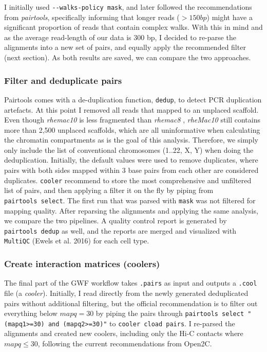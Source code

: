 \documentclass[
  11pt,
  a4paper,
]{scrbook}
\begin{document}
I initially used \texttt{-\/-walks-policy\ mask}, and later followed the
recommendations from \emph{pairtools}, specifically informing that
longer reads (\(>150bp\)) might have a significant proportion of reads
that contain complex walks. With this in mind and as the average
read-length of our data is 300 bp, I decided to re-parse the alignments
into a new set of pairs, and equally apply the recommended filter (next
section). As both results are saved, we can compare the two approaches.

\subsubsection{Filter and deduplicate
pairs}\label{filter-and-deduplicate-pairs}

Pairtools comes with a de-duplication function, \texttt{dedup}, to
detect PCR duplication artefacts. At this point I removed all reads that
mapped to an unplaced scaffold. Even though \emph{rhemac10} is less
fragmented than \emph{rhemac8} , \emph{rheMac10} still contains more
than 2,500 unplaced scaffolds, which are all uninformative when
calculating the chromatin compartments as is the goal of this analysis.
Therefore, we simply only include the list of conventional chromosomes
(1..22, X, Y) when doing the deduplication. Initially, the default
values were used to remove duplicates, where pairs with both sides
mapped within 3 base pairs from each other are considered duplicates.
\texttt{cooler} recommend to store the most comprehensive and unfiltered
list of pairs, and then applying a filter it on the fly by piping from
\texttt{pairtools\ select}. The first run that was parsed with
\texttt{mask} was not filtered for mapping quality. After reparsing the
alignments and applying the same analysis, we compare the two pipelines.
A quality control report is generated by \texttt{pairtools\ dedup} as
well, and the reports are merged and visualized with \texttt{MultiQC}
(Ewels et al. 2016) for each cell type.

\subsubsection{Create interaction matrices
(coolers)}\label{create-interaction-matrices-coolers}

The final part of the GWF workflow takes \texttt{.pairs} as input and
outputs a \texttt{.cool} file (a \emph{cooler}). Initially, I read
directly from the newly generated deduplicated pairs without additional
filtering, but the official recommendation is to filter out everything
below \(mapq = 30\) by piping the pairs through
\texttt{pairtools\ select\ "(mapq1\textgreater{}=30)\ and\ (mapq2\textgreater{}=30)"}
to \texttt{cooler\ cload\ pairs}. I re-parsed the alignments and created
new coolers, including only the Hi-C contacts where \(mapq \leq 30\),
following the current recommendations from Open2C.
\end{document}
